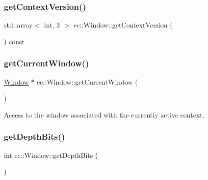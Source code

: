 \subsubsection{\texorpdfstring{get\+Context\+Version()}{getContextVersion()}}
{\footnotesize\ttfamily std\+::array$<$ int, 3 $>$ ec\+::\+Window\+::get\+Context\+Version (\begin{DoxyParamCaption}{ }\end{DoxyParamCaption}) const}

\mbox{\label{classec_1_1_window_aca8cec4837055174791755b5bdef5949}} 
\subsubsection{\texorpdfstring{get\+Current\+Window()}{getCurrentWindow()}}
{\footnotesize\ttfamily \mbox{\hyperlink{classec_1_1_window}{Window}} $\ast$ ec\+::\+Window\+::get\+Current\+Window (\begin{DoxyParamCaption}{ }\end{DoxyParamCaption})\hspace{0.3cm}{\ttfamily [static]}}

Access to the window associated with the currently active context. \mbox{\label{classec_1_1_window_a3a30627927e3a7e113100cf43cae340b}} 
\subsubsection{\texorpdfstring{get\+Depth\+Bits()}{getDepthBits()}}
{\footnotesize\ttfamily int ec\+::\+Window\+::get\+Depth\+Bits (\begin{DoxyParamCaption}{ }\end{DoxyParamCaption})\hspace{0.3cm}{\ttfamily [static]}}

\mbox{\label{classec_1_1_window_a9dda11a247352aa51fea720076174535}} 

